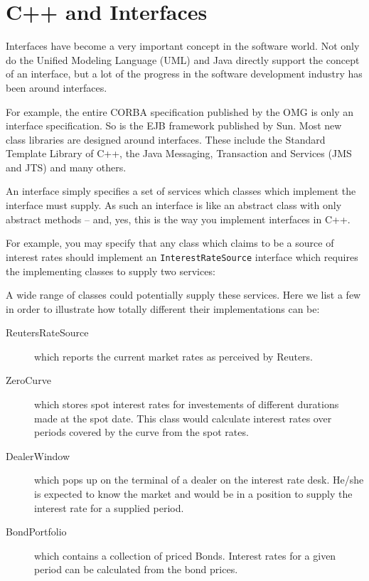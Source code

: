 \section{C++ and Interfaces}

Interfaces have become a very important concept in the software world.
Not only do the Unified Modeling Language (UML) and Java directly
support the concept of an interface, but a lot of the progress in the
software development industry has been around interfaces.

For example, the entire CORBA specification published by the OMG is
only an interface specification. So is the EJB framework published by
Sun. Most new class libraries are designed around interfaces. These include
the Standard Template Library of C++, the Java Messaging, Transaction and
Services (JMS and JTS) and many others.

An interface simply specifies a set of services which classes which
implement the interface must supply. As such an interface is like
an abstract class with only abstract methods -- and, yes, this is the
way you implement interfaces in C++.

For example, you may specify that any class which claims to be a source
of interest rates should implement an \verb+InterestRateSource+ interface
which requires the implementing classes to supply two services:


A wide range of classes could potentially supply these services. Here we
list a few in order to illustrate how totally different their implementations
can be:
\begin{description}
  \item[ReutersRateSource] which reports the current market rates as perceived
        by Reuters.
  \item[ZeroCurve] which stores spot interest rates for investements of
        different durations made at the spot date. This class would
        calculate interest rates over periods covered by the curve from
        the spot rates.
  \item[DealerWindow] which pops up on the terminal of a dealer on the
        interest rate desk. He/she is expected to know the market and
        would be in a position to supply the interest rate for a supplied
        period.
  \item[BondPortfolio] which contains a collection of priced Bonds. 
        Interest rates for  a given period can be calculated from the
        bond prices.
\end{description}

